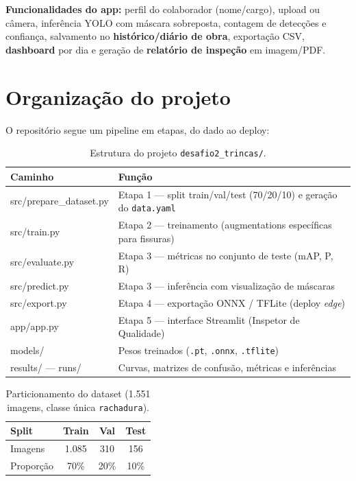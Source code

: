 \documentclass[11pt,a4paper]{article}
\begin{document}
\begin{infobox}
\textbf{Funcionalidades do app:} perfil do colaborador (nome/cargo), upload ou câmera,
inferência YOLO com máscara sobreposta, contagem de detecções e confiança, salvamento no
\textbf{histórico/diário de obra}, exportação CSV, \textbf{dashboard} por dia e geração de
\textbf{relatório de inspeção} em imagem/PDF.
\end{infobox}

\section{Organização do projeto}
O repositório segue um pipeline em etapas, do dado ao deploy:

\begin{table}[H]\centering\small
\renewcommand{\arraystretch}{1.25}
\begin{tabular}{>{\ttfamily}l >{\raggedright\arraybackslash}p{10.5cm}}
\toprule
\textnormal{\textbf{Caminho}} & \textbf{Função} \\
\midrule
src/prepare\_dataset.py & Etapa 1 — split train/val/test (70/20/10) e geração do \texttt{data.yaml} \\
src/train.py            & Etapa 2 — treinamento (augmentations específicas para fissuras) \\
src/evaluate.py         & Etapa 3 — métricas no conjunto de teste (mAP, P, R) \\
src/predict.py          & Etapa 3 — inferência com visualização de máscaras \\
src/export.py           & Etapa 4 — exportação ONNX / TFLite (deploy \emph{edge}) \\
app/app.py              & Etapa 5 — interface Streamlit (Inspetor de Qualidade) \\
models/                 & Pesos treinados (\texttt{.pt}, \texttt{.onnx}, \texttt{.tflite}) \\
results/ — runs/        & Curvas, matrizes de confusão, métricas e inferências \\
\bottomrule
\end{tabular}
\caption{Estrutura do projeto \texttt{desafio2\_trincas/}.}
\end{table}

\begin{table}[H]\centering\small
\renewcommand{\arraystretch}{1.25}
\begin{tabular}{lccc}
\toprule
\textbf{Split} & \textbf{Train} & \textbf{Val} & \textbf{Test} \\
\midrule
Imagens & 1.085 & 310 & 156 \\
Proporção & 70\% & 20\% & 10\% \\
\bottomrule
\end{tabular}
\caption{Particionamento do dataset (1.551 imagens, classe única \texttt{rachadura}).}
\end{table}
\end{document}
